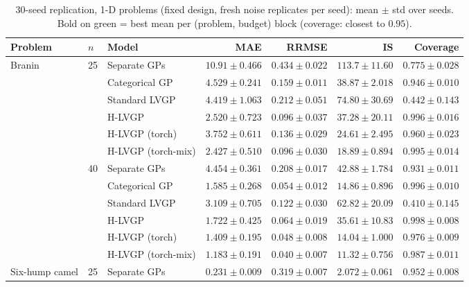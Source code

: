 \begin{table}[htbp]
\centering
\small
%
\setlength{\tabcolsep}{3pt}
\caption{30-seed replication, 1-D problems (fixed design, fresh noise replicates per seed): mean $\pm$ std over seeds. Bold on green = best mean per (problem, budget) block (coverage: closest to $0.95$).}
\label{tab:seeds}
\begin{tabular}{lllrrrr}
\toprule
Problem & $n$ & Model & MAE & RRMSE & IS & Coverage \\
\midrule
\multirow{12}{*}{Branin} & \multirow{6}{*}{25} & Separate GPs & $10.91 \pm 0.466$ & $0.434 \pm 0.022$ & $113.7 \pm 11.60$ & $0.775 \pm 0.028$ \\
 &  & Categorical GP & $4.529 \pm 0.241$ & $0.159 \pm 0.011$ & $38.87 \pm 2.018$ & \colorbox{green!20}{\boldmath$0.946 \pm 0.010$} \\
 &  & Standard LVGP & $4.419 \pm 1.063$ & $0.212 \pm 0.051$ & $74.80 \pm 30.69$ & $0.442 \pm 0.143$ \\
 &  & H-LVGP & $2.520 \pm 0.723$ & \colorbox{green!20}{\boldmath$0.096 \pm 0.037$} & $37.28 \pm 20.11$ & $0.996 \pm 0.016$ \\
 &  & H-LVGP (torch) & $3.752 \pm 0.611$ & $0.136 \pm 0.029$ & $24.61 \pm 2.495$ & $0.960 \pm 0.023$ \\
 &  & H-LVGP (torch-mix) & \colorbox{green!20}{\boldmath$2.427 \pm 0.510$} & $0.096 \pm 0.030$ & \colorbox{green!20}{\boldmath$18.89 \pm 0.894$} & $0.995 \pm 0.014$ \\
\cmidrule(lr){2-7}
 & \multirow{6}{*}{40} & Separate GPs & $4.454 \pm 0.361$ & $0.208 \pm 0.017$ & $42.88 \pm 1.784$ & \colorbox{green!20}{\boldmath$0.931 \pm 0.011$} \\
 &  & Categorical GP & $1.585 \pm 0.268$ & $0.054 \pm 0.012$ & $14.86 \pm 0.896$ & $0.996 \pm 0.010$ \\
 &  & Standard LVGP & $3.109 \pm 0.705$ & $0.122 \pm 0.030$ & $62.82 \pm 20.09$ & $0.410 \pm 0.145$ \\
 &  & H-LVGP & $1.722 \pm 0.425$ & $0.064 \pm 0.019$ & $35.61 \pm 10.83$ & $0.998 \pm 0.008$ \\
 &  & H-LVGP (torch) & $1.409 \pm 0.195$ & $0.048 \pm 0.008$ & $14.04 \pm 1.000$ & $0.976 \pm 0.009$ \\
 &  & H-LVGP (torch-mix) & \colorbox{green!20}{\boldmath$1.183 \pm 0.191$} & \colorbox{green!20}{\boldmath$0.040 \pm 0.007$} & \colorbox{green!20}{\boldmath$11.32 \pm 0.756$} & $0.987 \pm 0.011$ \\
\midrule
\multirow{12}{*}{Six-hump camel} & \multirow{6}{*}{25} & Separate GPs & $0.231 \pm 0.009$ & $0.319 \pm 0.007$ & $2.072 \pm 0.061$ & \colorbox{green!20}{\boldmath$0.952 \pm 0.008$} \\

\end{tabular}
\end{table}
